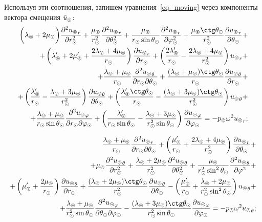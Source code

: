 Используя эти соотношения, запишем уравнения~\eqref{eq_moving} через компоненты вектора смещения $\bar{u}_\circledcirc$:
\begin{equation*}
\begin{split}
\biggl(\la\l+2\mu\l\biggr)\fr{\de^2 {u\l}_r}{\de r\s^2} + \fr{\mu\l}{r\s^2}\fr{\de^2 {u\l}_r}{\de\Q\s^2} +\fr{\mu\l}{r\s\sin\Q\s}\fr{\de^2 {u\l}_r}{\de\f\s^2} + \fr{\mu\l\ctg\Q\s}{r\s^2}\fr{\de {u\l}_r}{\de \Q\s} + \\
+ \left(\la\l'+2\mu\l'+\fr{2\la\l+4\mu\l}{r\s}\right)\fr{\de{u\l}_r}{\de r\s} + \left(\fr{2\la\l'}{r\s} - \fr{2\la\l+4\mu\l}{r\s^2}\right){u\l}_r + \\
+ \fr{\la\l+\mu\l}{r\s}\fr{\de^2 {u\l}_\Q}{\de r\s\de\Q\s} + \fr{(\la\l+\mu\l)\ctg\Q\s}{r\s}\fr{\de {u\l}_\Q}{\de r\s} + \\ 
+ \left(\fr{\la\l'}{r\s} - \fr{\la\l+3\mu\l}{r\s^2}\right)\fr{\de {u\l}_\Q}{\de \Q\s} +\left(\fr{\la\l'\ctg\Q\s}{r\s} - \fr{(\la\l+3\mu\l)\ctg\Q\s}{r\s^2}\right){u\l}_\Q + \\
+\fr{\la\l+\mu\l}{r\s\sin\Q\s}\fr{\de^2 {u\l}_\f}{\de r\s\de\f\s}
+ \left(\fr{\la\l'}{r\s\sin\Q\s} - \fr{\la\s+3\mu\s}{r\s^2\sin\Q\s}\right)\fr{\de {u\l}_\f}{\de \f\s} = -p\l\om^2{u\l}_r;
\end{split}
\end{equation*}

\begin{equation*}
\begin{split}
\fr{\la\l+\mu\l}{r\s}\fr{\de^2 {u\l}_r}{\de r\s \de \Q\s} + \left(\fr{\mu\l'}{r\s}+\fr{2\la\l+4\mu\l}{r\s^2}\right)\fr{\de {u\l}_r}{\de \Q\s} + \\
+ \mu\l \fr{\de^2 {u\l}_\Q}{\de r\s^2} + \fr{\la\l+2\mu\l}{r\s^2}\fr{\de^2 {u\l}_\Q}{\de \Q\s^2} + \fr{\mu\l}{r\s^2\sin^2\Q\s} \fr{\de^2 {u\l}_\Q}{\de \f^2} + \\
+ \left(\mu\l'+ \fr{2\mu\l}{r\s}\right)\fr{\de {u\l}_\Q}{\de r\s} + \fr{(\la\l+2\mu\l)\ctg\Q\s}{r\s^2}\fr{\de{u\l}_\Q}{\de \Q\s}-\left(\fr{\mu\l'}{r\s} + \fr{\la\l+2\mu\l}{r\s^2\sin^2\Q\s}\right){u\l}_\Q + \\
+ \fr{\la\l+\mu\l}{r\s^2\sin\Q\s}\fr{\de^2{u\l}_\f}{\de \Q\s \de \f\s} - \fr{(\la\l+3\mu\l)\ctg\Q\s}{r\s^2\sin\Q\s}\fr{\de {u\l}_\f}{\de \f\s}  = -p\l\om^2{u\l}_\Q;
\end{split}
\end{equation*}

